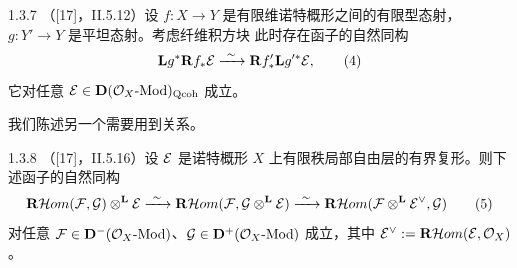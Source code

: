 \begin{proposition}{1.3.7}
（[17]，II.5.12）设 $f:X\to Y$ 是有限维诺特概形之间的有限型态射，$g:Y'\to Y$ 是平坦态射。考虑纤维积方块
此时存在函子的自然同构
\begin{equation}
\mathbf{L}g^{*}\mathbf{R}f_{*}\cE\xrightarrow{\ \sim\ }\mathbf{R}f'_{*}\mathbf{L}g'^{*}\cE,
\tag{4}
\end{equation}
它对任意 $\mathcal{E}\in\mathbf{D}(\mathcal{O}_X\text{-}\mathrm{Mod})_{\mathrm{Qcoh}}$ 成立。
\end{proposition}

我们陈述另一个需要用到关系。

\begin{proposition}{1.3.8}
（[17]，II.5.16）设 $\mathcal{E}$ 是诺特概形 $X$ 上有限秩局部自由层的有界复形。则下述函子的自然同构
\begin{equation}
\mathbf{R}\mathcal{H}om(\cF,\cG)\otL\cE\xrightarrow{\ \sim\ }\mathbf{R}\mathcal{H}om(\cF,\cG\otL\cE)\xrightarrow{\ \sim\ }\mathbf{R}\mathcal{H}om(\cF\otL\cE^{\vee},\cG)
\tag{5}
\end{equation}
对任意 $\mathcal{F}\in\mathbf{D}^{-}(\mathcal{O}_X\text{-}\mathrm{Mod})$、$\mathcal{G}\in\mathbf{D}^{+}(\mathcal{O}_X\text{-}\mathrm{Mod})$ 成立，其中 $\mathcal{E}^{\vee}:=\mathbf{R}\mathcal{H}om(\mathcal{E},\mathcal{O}_X)$。
\end{proposition}

